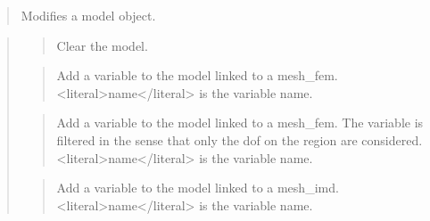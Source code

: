 \documentclass[a4paper,11pt,english]{sphinxmanual}
\begin{document}
\sphinxAtStartPar
{}
\begin{quote}

\sphinxAtStartPar
Modifies a model object.
\end{quote}

\sphinxAtStartPar
{}
\begin{quote}

\sphinxAtStartPar
{}
\begin{quote}

\sphinxAtStartPar
Clear the model.
\end{quote}

\sphinxAtStartPar
{}
\begin{quote}

\sphinxAtStartPar
Add a variable to the model linked to a mesh\_fem. \textless{}literal\textgreater{}name\textless{}/literal\textgreater{} is the variable
name.
\end{quote}

\sphinxAtStartPar
{}
\begin{quote}

\sphinxAtStartPar
Add a variable to the model linked to a mesh\_fem. The variable is filtered
in the sense that only the dof on the region are considered.
\textless{}literal\textgreater{}name\textless{}/literal\textgreater{} is the variable name.
\end{quote}

\sphinxAtStartPar
{}
\begin{quote}

\sphinxAtStartPar
Add a variable to the model linked to a mesh\_imd. \textless{}literal\textgreater{}name\textless{}/literal\textgreater{} is the variable
name.
\end{quote}

\sphinxAtStartPar
{}
\begin{quote}


\end{quote}
\end{quote}
\end{document}
